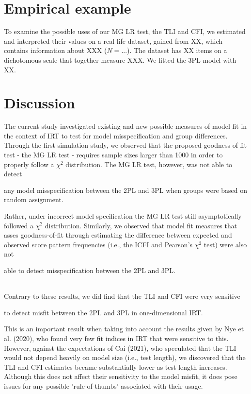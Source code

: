 \documentclass[Royal,sageapa,times,doublespace]{sagej}
\begin{document}
\newpage

\section{Empirical example}
To examine the possible uses of our MG LR test, the TLI and CFI, we estimated and interpreted their values on a real-life dataset, gained from XX, which contains information about XXX ($N = ...$). The dataset has XX items on a dichotomous scale that together measure XXX. We fitted the 3PL model with XX.

\section{Discussion}

The current study investigated existing and new possible measures of model fit in the context of IRT to test for model misspecification and group differences. Through the first simulation study, we observed that the proposed goodness-of-fit test - the MG LR test - requires sample sizes larger than 1000 in order to properly follow a $\chi^2$ distribution. The MG LR test, however, was not able to detect 

any model misspecification between the 2PL and 3PL when groups were based on random assignment. 

Rather, under incorrect model specification the MG LR test still asymptotically followed a $\chi^2$ distribution. Similarly, we observed that model fit measures that asses goodness-of-fit through estimating the difference between expected and observed score pattern frequencies (i.e., the ICFI and Pearson's $\chi^2$ test) were also not 

able to detect misspecification between the 2PL and 3PL. %

\\
\indent Contrary to these results, we did find that the TLI and CFI were very sensitive 

to detect misfit between the 2PL and 3PL in one-dimensional IRT. %

This is an important result when taking into account the results given by Nye et al. (2020), who found very few fit indices in IRT that were sensitive to this. However, against the expectations of Cai (2021), who speculated that the TLI would not depend heavily on model size (i.e., test length), we discovered that the TLI and CFI estimates became substantially lower as test length increases. Although this does not affect their sensitivity to the model misfit, it does pose issues for any possible 'rule-of-thumbs' associated with their usage. 
\end{document}
